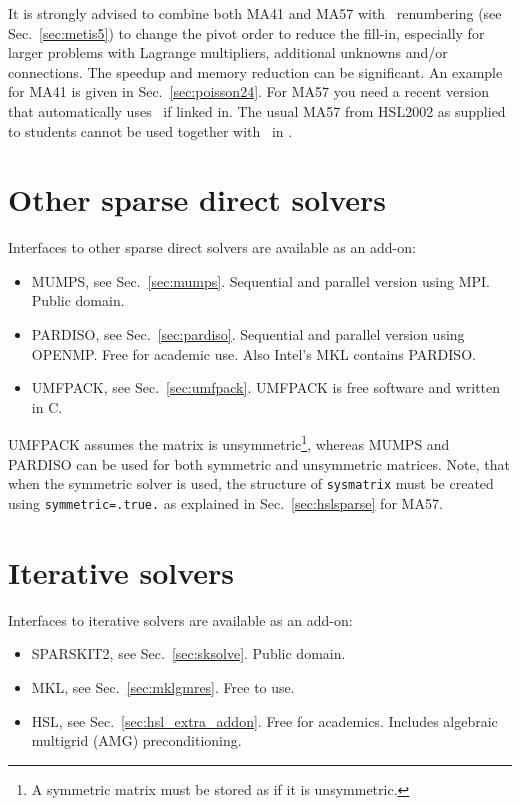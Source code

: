 It is strongly advised to combine both MA41 and MA57 with \metis\
renumbering
(see Sec.~\ref{sec:metis5}) to change the pivot order to reduce the fill-in, especially for larger problems with Lagrange multipliers, additional unknowns and/or connections. The speedup and memory reduction can be significant. An example for MA41 is given in Sec.~\ref{sec:poisson24}. For MA57 you need a recent version that automatically uses \metis\ if linked in. The usual MA57 from HSL2002 as supplied to students cannot be used together with \metis\ in \tfem.

\section{Other sparse direct solvers}

Interfaces to other sparse direct solvers are available as an add-on:
\begin{itemize}
   \item MUMPS, see Sec.~\ref{sec:mumps}.
         Sequential and parallel version using MPI.
         Public domain.
   \item PARDISO, see Sec.~\ref{sec:pardiso}. 
         Sequential and parallel version using
         OPENMP. Free for academic use. Also Intel's MKL contains PARDISO.
   \item UMFPACK, see Sec.~\ref{sec:umfpack}. UMFPACK is free software and written in C.
   \end{itemize}
UMFPACK assumes the matrix is unsymmetric\footnote{A symmetric matrix must be stored as if it is unsymmetric.}, whereas MUMPS and PARDISO can be used for both symmetric and unsymmetric matrices. Note, that when the symmetric solver is used, the structure of
\texttt{sysmatrix} must be created using \texttt{symmetric=.true.} as explained
in Sec.~\ref{sec:hslsparse} for MA57.

\section{Iterative solvers}

Interfaces to iterative solvers are available as an add-on:
\begin{itemize}
   \item SPARSKIT2, see Sec.~\ref{sec:sksolve}. Public domain. 
   \item MKL, see Sec.~\ref{sec:mklgmres}. Free to use.
   \item HSL, see Sec.~\ref{sec:hsl_extra_addon}. Free for academics.
    Includes algebraic multigrid (AMG) preconditioning.
\end{itemize}

